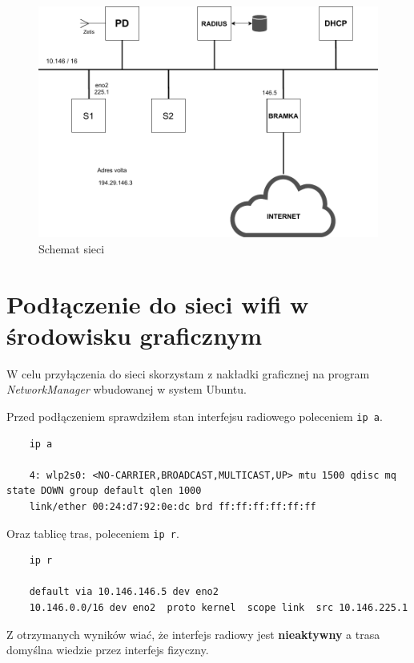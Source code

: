 \documentclass{mwart} %
\begin{document}
\begin{figure}[H]
  \centering
  \includegraphics[width=\textwidth]{SchematSieci}
  
  \caption{Schemat sieci}
  \label{fig:SchematSieci}
\end{figure}

\section{Podłączenie do sieci wifi w środowisku graficznym}
W celu przyłączenia do sieci skorzystam z nakładki graficznej na program \textit{NetworkManager} wbudowanej w system Ubuntu.
\vspace{5 mm}

Przed podłączeniem sprawdziłem stan interfejsu radiowego poleceniem \texttt{ip~a}.
\begin{verbatim}
    ip a

    4: wlp2s0: <NO-CARRIER,BROADCAST,MULTICAST,UP> mtu 1500 qdisc mq state DOWN group default qlen 1000
    link/ether 00:24:d7:92:0e:dc brd ff:ff:ff:ff:ff:ff
\end{verbatim}

Oraz tablicę tras, poleceniem \texttt{ip r}.
\begin{verbatim}
    ip r 

    default via 10.146.146.5 dev eno2
    10.146.0.0/16 dev eno2  proto kernel  scope link  src 10.146.225.1
\end{verbatim}

Z otrzymanych wyników wiać, że interfejs radiowy jest \textbf{nieaktywny} a trasa domyślna wiedzie przez interfejs fizyczny.
\vspace{5 mm}
\end{document}
